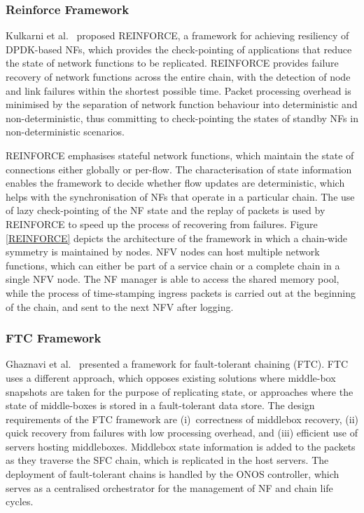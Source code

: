 \documentclass[futureinternet,review,accept,pdftex,moreauthors]{Definitions/mdpi}
\begin{document}
\subsubsection{Reinforce Framework}
Kulkarni {et al.}~\cite{kulkarni2020reinforce} proposed REINFORCE, a framework for achieving resiliency of DPDK-based NFs, which provides the check-pointing of applications that reduce the state of network functions to be replicated. REINFORCE provides failure recovery of network functions across the entire chain, with the detection of node and link failures within the shortest possible time. Packet processing overhead is minimised by the separation of network function behaviour into deterministic and non-deterministic, thus committing to check-pointing the states of standby NFs in non-deterministic scenarios. 




REINFORCE  emphasises stateful network functions, which maintain the state of connections either globally or per-flow. The characterisation of state information enables the framework to decide whether flow updates are deterministic, which helps with the synchronisation of NFs that operate in a particular chain. The use of lazy check-pointing of the NF state and the replay of packets is used by REINFORCE to speed up the process of recovering from failures. Figure \ref{REINFORCE} depicts the architecture of the framework in which a chain-wide symmetry is maintained by nodes. NFV nodes can host multiple network functions, which can either be part of a service chain or a complete chain in a single NFV node. The NF manager is able to access the shared memory pool, while the process of time-stamping ingress packets is carried out at the beginning of the chain, and sent to the next NFV after logging.



\subsubsection{FTC Framework}
\label{FTC}
Ghaznavi {et al.}~\cite{ghaznavi2020fault} presented a framework for fault-tolerant chaining (FTC). FTC uses a different approach, which opposes existing solutions where middle-box snapshots are taken for the purpose of replicating state, or approaches where the state of middle-boxes is stored in a fault-tolerant data store. The design requirements of the FTC framework are (i)~correctness of middlebox recovery, (ii) quick recovery from failures with low processing overhead, and (iii) efficient use of servers hosting middleboxes. Middlebox state information is added to the packets as they traverse the SFC chain, which is replicated in the host servers. The deployment of fault-tolerant chains is handled by the ONOS controller, which serves as a centralised orchestrator for the management of NF and chain life cycles. 
\end{document}
